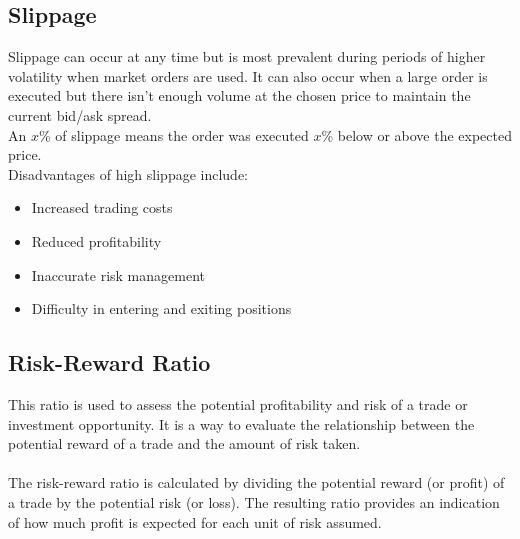 \subsection{Slippage}
Slippage can occur at any time but is most prevalent during periods of higher volatility when market orders are used. It can also occur when a large order is executed but there isn't enough volume at the chosen price to maintain the current bid/ask spread. \\
An $x$\% of slippage means the order was executed $x$\% below or above the expected price. \\
Disadvantages of high slippage include:
\begin{itemize}
  \item Increased trading costs
  \item Reduced profitability
  \item Inaccurate risk management
  \item Difficulty in entering and exiting positions
\end{itemize}

\subsection{Risk-Reward Ratio}
This ratio is used to assess the potential profitability and risk of a trade or investment opportunity. It is a way to evaluate the relationship between the potential reward of a trade and the amount of risk taken. \\
\\
The risk-reward ratio is calculated by dividing the potential reward (or profit) of a trade by the potential risk (or loss). The resulting ratio provides an indication of how much profit is expected for each unit of risk assumed.

